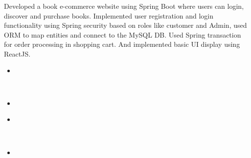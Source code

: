 \documentclass[10pt,a4paper,ragged2e,withhyper]{altacv}
\begin{document}
\begin{paracol}{2}
\begin{adjustwidth}{1em}{0em}
Developed a book e-commerce website using Spring Boot where users can login, discover and purchase books. Implemented user registration and login functionality using Spring security based on roles like customer and Admin, used ORM to map entities and connect to the MySQL DB. Used Spring transaction for order processing in shopping cart. And implemented basic UI display using ReactJS.
\end{adjustwidth}
\vspace{10pt}
\begin{itemize}
\item {}
\end{itemize}
\\
\begin{itemize}
\item {}
\end{itemize}
\begin{itemize}
\item {}
\end{itemize}
\\
\begin{itemize}
\item {}
\end{itemize}

\divider\smallskip

\\
\\


\medskip



\end{paracol}
\end{document}
